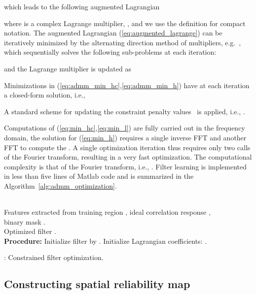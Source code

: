 \documentclass[twocolumn]{article}
\begin{document}
which leads to the following augmented Lagrangian~\citep{admm_boyd2011}

where  is a complex Lagrange multiplier, , and we use the definition
 for compact notation. The augmented Lagrangian (\ref{eq:augmented_lagrange}) can be iteratively minimized by the alternating direction method of multipliers, e.g.~\cite{admm_boyd2011}, which sequentially solves the following sub-problems at each iteration: 
 
and the Lagrange multiplier is updated as 

Minimizations in (\ref{eq:admm_min_hc},\ref{eq:admm_min_h}) have at each iteration a closed-form solution, i.e.,


A standard scheme for updating the constraint penalty  values~\citep{admm_boyd2011} is applied, i.e., .

Computations of (\ref{eq:min_hc},\ref{eq:min_l}) are fully carried out in the frequency domain, the solution for (\ref{eq:min_h}) requires a single inverse FFT and another FFT to compute the . A single optimization iteration thus requires only two calls of the Fourier transform, resulting in a very fast optimization. The computational complexity is that of the Fourier transform, i.e., . Filter learning is implemented in less than five lines of Matlab code and is summarized in the Algorithm~\ref{alg:admm_optimization}.

\begin{algorithm}[h!]
\begin{algorithmic}[1]
 \REQUIRE {~}\\
    Features extracted from training region , ideal correlation response , \\
    binary mask .
 \ENSURE {~}\\
    Optimized filter .
 \\\hspace{-0.6cm}\textbf{Procedure:}
 	\STATE Initialize filter  by . \STATE Initialize Lagrangian coefficients: .
	\ENDWHILE
\end{algorithmic}
\caption{\label{alg:admm_optimization}: Constrained filter optimization.}
\end{algorithm}

\subsection{Constructing spatial reliability map}\label{sec:spatial_prior}
\end{document}
